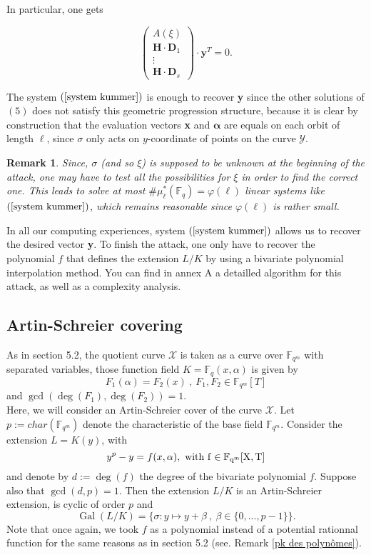 \documentclass[10pt]{article}
\newtheorem{rq1}[thm]{Remark}
\newcommand{\s}{\vspace{0.3cm}}
\newcommand{\cd}{\cdot}
\newcommand{\fqm}{\mathbb{F}_{q^m}}
\newcommand{\fq}{\mathbb{F}_q}
\newcommand{\X}{\mathcal{X}}
\newcommand{\Y}{\mathcal{Y}}
\newcommand{\Gal}{\operatorname{Gal}}
\begin{document}
In particular, one gets


\begin{equation} \label{system kummer}
\begin{pmatrix}
A(\xi) \\
\mathbf{H} \cd \textbf{D}_1 \\
\vdots \\
\mathbf{H} \cd \textbf{D}_s
\end{pmatrix}
\cd \textbf{y}^T = 0.
\end{equation}

The system $(\ref{system kummer})$ is enough to recover \textbf{y} since the other solutions of $(5)$ does not satisfy this geometric progression structure, because it is clear by construction that the evaluation vectors \textbf{x} and $\boldsymbol{\alpha}$ are equals on each orbit of length $\ell$, since $\sigma$ only acts on $y$-coordinate of points on the curve $\Y$. 

\s

\begin{rq1} \rm
Since, $\sigma$ (and so $\xi$) is supposed to be unknown at the beginning of the attack, one may have to test all the possibilities for $\xi$ in order to find the correct one. This leads to solve at most $\#\mu^*_{\ell}(\fq) = \varphi(\ell)$ linear systems like $(\ref{system kummer})$, which remains reasonable since $\varphi(\ell)$ is rather small.
\end{rq1}

\s

In all our computing experiences, system $(\ref{system kummer})$ allows us to recover the desired vector \textbf{y}. To finish the attack, one only have to recover the polynomial $f$ that defines the extension $L/K$ by using a bivariate polynomial interpolation method. You can find in annex A a detailled algorithm for this attack, as well as a complexity analysis.

\s


\subsection{Artin-Schreier covering}

\s

As in section 5.2, the quotient curve $\X$ is taken as a curve over $\fqm$ with separated variables, those function field $K = \fq(x,\alpha)$ is given by 
\[F_1(\alpha) = F_2(x) \ , \ F_1,F_2 \in \fqm[T]\]
and $\gcd(\deg(F_1),\deg(F_2))=1$. \\ 
Here, we will consider an Artin-Schreier cover of the curve $\X$.
Let $p:=char(\fqm)$ denote the characteristic of the base field $\fqm$. Consider the extension $L=K(y)$, with
\[y^p-y = f(x,\alpha) , \ \rm with  \ f \in \fqm[X,T]\]
and denote by $d:=\deg(f)$ the degree of the bivariate polynomial $f$. Suppose also that $\gcd(d,p)=1$. Then the extension $L/K$ is an Artin-Schreier extension, is cyclic of order $p$ and 
\[\Gal(L/K) = \{ \sigma : y \mapsto y + \beta \ , \ \beta \in \{0,...,p-1\}\}.\]
Note that once again, we took $f$ as a polynomial instead of a potential rationnal function for the same reasons as in section 5.2 (see. Remark \ref{pk des polynômes}).
\end{document}
